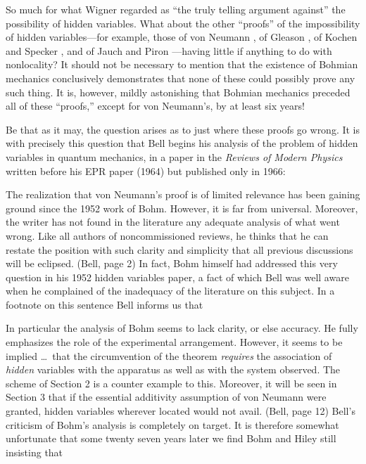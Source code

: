 So much for what Wigner regarded as ``the truly telling argument against''
the possibility of hidden variables. What about the other ``proofs'' of the
impossibility of hidden variables---for example, those of von Neumann
\cite{vN}, of Gleason \cite{Gleason}, of Kochen and Specker \cite{KS}, and of
Jauch and Piron \cite{JP}---having little if anything to do with
nonlocality? It should not be necessary to mention that the existence of
Bohmian mechanics conclusively demonstrates that none of these could
possibly prove any such thing. It is, however, mildly astonishing that
Bohmian mechanics preceded all of these ``proofs,'' except for von
Neumann's, by at least six years!

Be that as it may, the question arises as to just where these proofs go
wrong. It is with precisely this question that Bell begins his analysis of
the problem of hidden variables in quantum mechanics, in a paper
\cite{Bell2} in the {\it Reviews of Modern Physics\/} written before his
EPR paper (1964) but published only in 1966:

\bq The realization that von Neumann's proof is of
limited relevance has been gaining ground since the 1952 work of Bohm.
However, it is far from universal. Moreover, the writer has not found in
the literature any adequate analysis of what went wrong. Like all authors
of noncommissioned reviews, he thinks that he can restate the position with
such clarity and simplicity that all previous discussions will be eclipsed.
(Bell, page 2)
\eq
In fact, Bohm himself had addressed this very question in his 1952 hidden
variables paper, a fact of which Bell was well aware when he complained
of the inadequacy of the literature on this subject. In a
footnote on this sentence Bell  informs us that

\bq\noindent In particular the analysis of Bohm seems to lack clarity, or else
accuracy. He fully emphasizes the role of the experimental arrangement.
However, it seems to be implied \dots\  that the circumvention of the theorem
{\it requires\/}  the association of {\it hidden\/} variables with the
apparatus as well as with the system observed. The scheme of Section 2
is a counter example to this. Moreover, it will be seen in Section 3 that
if the essential additivity assumption of von Neumann were granted, hidden
variables wherever located would not avail. (Bell, page 12)
\eq
Bell's criticism of Bohm's analysis is completely on target. It is therefore
somewhat unfortunate that some twenty seven years later we find Bohm and Hiley
still insisting that

